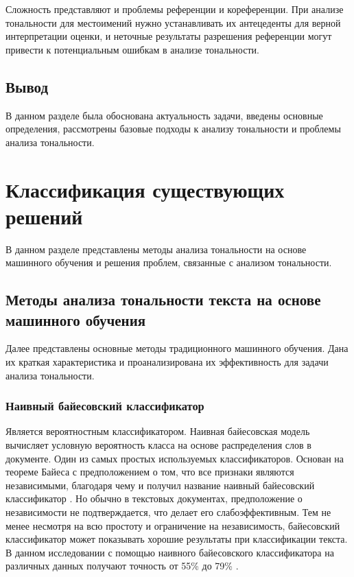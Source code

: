 \documentclass[a4paper,14pt, unknownkeysallowed]{extreport}
\begin{document}
Сложность представляют и проблемы референции и кореференции. При анализе тональности для местоимений нужно устанавливать их антецеденты для верной интерпретации оценки, и неточные результаты разрешения референции могут привести к потенциальным ошибкам в анализе тональности. 

\section{Вывод}

В данном разделе была обоснована актуальность задачи, введены основные определения, рассмотрены базовые подходы к анализу тональности и проблемы анализа тональности.

\chapter{Классификация существующих решений}

В данном разделе представлены методы анализа тональности на основе машинного обучения и решения проблем, связанные с анализом тональности.

\section{Методы анализа тональности текста на основе машинного обучения}

Далее представлены основные методы традиционного машинного обучения. Дана их краткая характеристика и проанализирована их эффективность для задачи анализа тональности. 

	\subsection{Наивный байесовский классификатор}
	
	Является вероятностным классификатором. Наивная байесовская модель вычисляет условную вероятность класса на основе распределения слов в документе. Один из самых простых используемых классификаторов. Основан на теореме Байеса с предположением о том, что все признаки являются независимыми, благодаря чему и получил название наивный байесовский классификатор \cite{Samigulin}. Но обычно в текстовых документах, предположение о независимости не подтверждается, что делает его слабоэффективным. Тем не менее несмотря на всю простоту и ограничение на независимость, байесовский классификатор может показывать хорошие результаты при классификации текста. В данном исследовании с помощью наивного байесовского классификатора на различных данных получают точность от 55\% до 79\% \cite{Hasan}.
	
\end{document}
